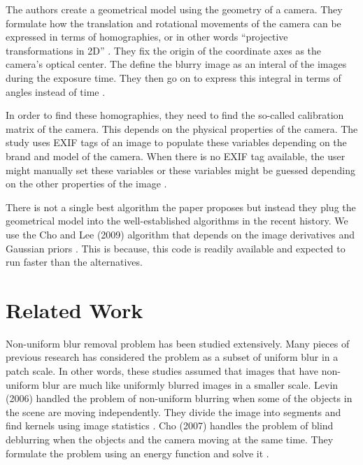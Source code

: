 \documentclass[10pt,twocolumn,letterpaper]{article}
\begin{document}
The authors create a geometrical model using the geometry of a camera. They formulate how the translation and rotational movements of the camera can be expressed in terms of homographies, or in other words ``projective transformations in 2D'' \cite{whyte2012non}. They fix the origin of the coordinate axes as the camera's optical center. The define the blurry image as an interal of the images during the exposure time. They then go on to express this integral in terms of angles instead of time \cite{whyte2012non}. 

In order to find these homographies, they need to find the so-called calibration matrix of the camera. This depends on the physical properties of the camera. The study uses EXIF tags of an image to populate these variables depending on the brand and model of the camera. When there is no EXIF tag available, the user might manually set these variables or these variables might be guessed depending on the other properties of the image \cite{whyte2012non}.

There is not a single best algorithm the paper proposes but instead they plug the geometrical model into the well-established algorithms in the recent history. We use the Cho and Lee (2009) algorithm that depends on the image derivatives and Gaussian priors \cite{cho2009fast}. This is because, this code is readily available and expected to run faster than the alternatives.





\section{Related Work}

Non-uniform blur removal problem has been studied extensively. Many pieces of previous research has considered the problem as a subset of uniform blur in a patch scale. In other words, these studies assumed that images that have non-uniform blur are much like uniformly blurred images in a smaller scale. Levin (2006) handled the problem of non-uniform blurring when some of the objects in the scene are moving independently. They divide the image into segments and find kernels using image statistics  \cite{levin2006blind}. Cho \etal (2007) handles the problem of blind deblurring when the objects and the camera moving at the same time. They formulate the problem using an energy function and solve it \cite{cho2007removing}. 
\end{document}
